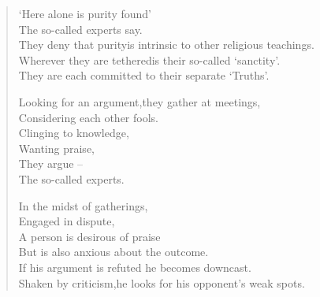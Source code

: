 
\begin{verse}

 `Here alone is purity found'\\
The so-called experts say.\\
They deny that purity\newline is intrinsic to other religious teachings.\\
Wherever they are tethered\newline is their so-called `sanctity'.\\
They are each committed to their separate `Truths'.


 Looking for an argument,\newline they gather at meetings,\\
Considering each other fools.\\
Clinging to knowledge,\\
Wanting praise,\\
They argue --\\
The so-called experts.


 In the midst of gatherings,\\
Engaged in dispute,\\
A person is desirous of praise\\
But is also anxious about the outcome.\\
If his argument is refuted he becomes downcast.\\
Shaken by criticism,\newline he looks for his opponent's weak spots.



\end{verse}
